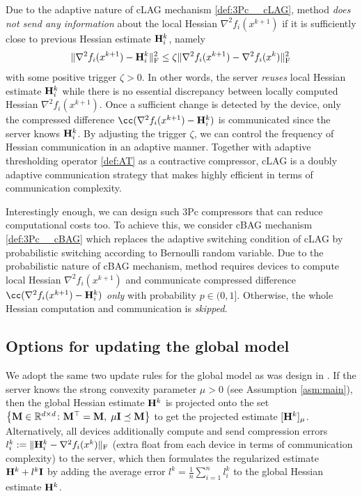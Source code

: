\documentclass[11pt]{article}
\begin{document}
	Due to the adaptive nature of cLAG mechanism \eqref{def:3Pc__cLAG},  method {\em does not send any information} about the local Hessian $\nabla^2 f_i(x^{k+1})$ if it is sufficiently close to previous Hessian estimate $\mathbf{H}_i^k$, namely $$\|\nabla^2 f_i(x^{k+1}) - \mathbf{H}_i^k\|^2_{\rm F} \le \zeta\|\nabla^2 f_i(x^{k+1}) - \nabla^2 f_i(x^{k})\|^2_{\rm F}$$ with some positive trigger $\zeta>0$. In other words, the server {\em reuses} local Hessian estimate $\mathbf{H}_i^k$ while there is no essential discrepancy between locally computed Hessian $\nabla^2 f_i(x^{k+1})$. Once a sufficient change is detected by the device, only the compressed difference $\cc(\nabla^2 f_i(x^{k+1}) - \mH_i^k)$ is communicated since the server knows $\mathbf{H}_i^k$. By adjusting the trigger $\zeta$, we can control the frequency of Hessian communication in an adaptive manner. Together with adaptive thresholding operator \eqref{def:AT} as a contractive compressor, cLAG is a doubly adaptive communication strategy that makes  highly efficient in terms of communication complexity.
	
	Interestingly enough, we can design such 3Pc compressors that can reduce computational costs too. To achieve this, we consider cBAG mechanism \eqref{def:3Pc__cBAG} which replaces the adaptive switching condition of cLAG by probabilistic switching according to Bernoulli random variable. Due to the probabilistic nature of cBAG mechanism,  method requires devices to compute local Hessian $\nabla^2 f_i(x^{k+1})$ and communicate compressed difference $\cc(\nabla^2 f_i(x^{k+1}) - \mH_i^k)$ {\em only} with probability $p\in(0,1]$. Otherwise, the whole Hessian computation and communication is {\em skipped}.

	
	\subsection{Options for updating the global model}
	We adopt the same two update rules for the global model as was design in . If the server knows the strong convexity parameter $\mu>0$ (see Assumption \ref{asm:main}), then the global Hessian estimate $\mathbf{H}^k$ is projected onto the set $\left\{\mathbf{M}\in\mathbb{R}^{d\times d} \colon \mathbf{M}^\top = \mathbf{M},\; \mu\mathbf{I} \preceq \mathbf{M} \right\}$ to get the projected estimate $[\mathbf{H}^k]_{\mu}$. 
	Alternatively, all devices additionally compute and send compression errors $l_i^k \; { := }\; \|\mathbf{H}_i^k - \nabla^2 f_i(x^k)\|_{\rm F}$ (extra float from each device in terms of communication complexity) to the server, which then formulates the regularized estimate $\mathbf{H}^k + l^k\mathbf{I}$ by adding the average error $l^k = \frac{1}{n}\sum_{i=1}^n l_i^k$ to the global Hessian estimate $\mathbf{H}^k$. 
	
\end{document}
